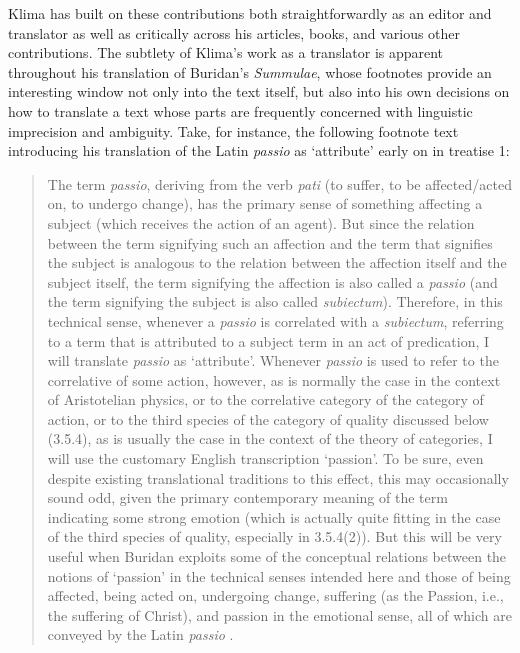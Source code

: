 \documentclass[]{article}
\begin{document}
Klima has built on these contributions 
both straightforwardly as an editor and translator 
as well as critically across his articles, books, and various other contributions. 
The subtlety of Klima's work as a translator is apparent throughout his translation of Buridan's \emph{Summulae}, 
whose footnotes provide an interesting window not only into the text itself, 
but also into his own decisions on how to translate a text whose parts are frequently concerned with linguistic imprecision and ambiguity.
Take, for instance, 
the following footnote text introducing his translation of the Latin \emph{passio} as `attribute' early on in treatise 1: %
\begin{quote}
	The term \emph{passio}, 
	deriving from the verb \emph{pati} 
	(to suffer, 
	to be affected/acted on, 
	to undergo change), 
	has the primary sense of something affecting a subject 
	(which receives the action of an agent). 
	But since the relation between the term signifying such an affection 
	and the term that signifies the subject 
	is analogous to the relation between the affection itself 
	and the subject itself, 
	the term signifying the affection is also called a \emph{passio} 
	(and the term signifying the
	subject is also called \emph{subiectum}). 
	Therefore, 
	in this technical sense, 
	whenever a \emph{passio} is correlated with a \emph{subiectum}, 
	referring to a term that is attributed to a subject term in an act of predication, 
	I will translate \emph{passio} as `attribute'. 
	Whenever \emph{passio} is used to refer to the correlative of some action, 
	however, 
	as is normally the case in the context of Aristotelian physics,
	or to the correlative category of the category of action, 
	or to the third species of the category of quality discussed below (3.5.4), 
	as is usually the case in the context of the theory of
	categories, 
	I will use the customary English transcription `passion'. 
	To be sure, 
	even despite existing translational traditions to this effect, 
	this may occasionally sound odd, 
	given the primary contemporary meaning of the term indicating some strong emotion (which is actually
	quite fitting in the case of the third species of quality, especially in 3.5.4(2)). 
	But this will be very useful when Buridan exploits some of the conceptual relations between the notions of
	`passion' in the technical senses intended here 
	and those of being affected, 
	being acted on, undergoing change, suffering 
	(as the Passion, i.e., the suffering of Christ), 
	and passion in the emotional sense, all of which are conveyed by the Latin \emph{passio} \autocite[5]{BuridanKlimaSD}.
\end{quote}
\end{document}
